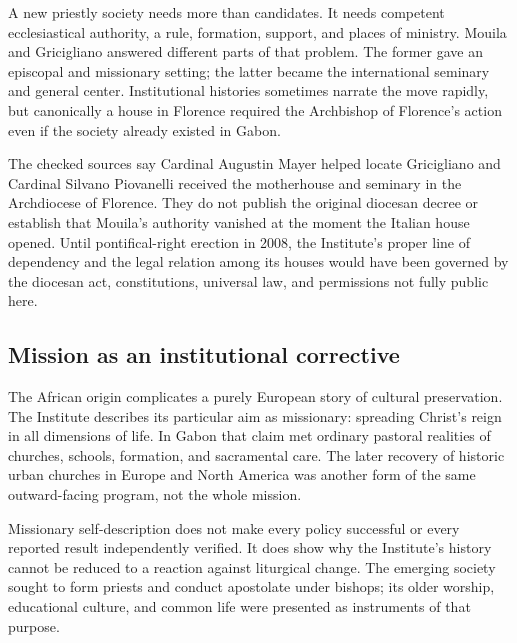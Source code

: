 A new priestly society needs more than candidates. It needs competent ecclesiastical authority, a rule, formation, support, and places of ministry. Mouila and Gricigliano answered different parts of that problem. The former gave an episcopal and missionary setting; the latter became the international seminary and general center. Institutional histories sometimes narrate the move rapidly, but canonically a house in Florence required the Archbishop of Florence's action even if the society already existed in Gabon.

The checked sources say Cardinal Augustin Mayer helped locate Gricigliano and Cardinal Silvano Piovanelli received the motherhouse and seminary in the Archdiocese of Florence. They do not publish the original diocesan decree or establish that Mouila's authority vanished at the moment the Italian house opened. Until pontifical-right erection in 2008, the Institute's proper line of dependency and the legal relation among its houses would have been governed by the diocesan act, constitutions, universal law, and permissions not fully public here.

\subsection{Mission as an institutional corrective}

The African origin complicates a purely European story of cultural preservation. The Institute describes its particular aim as missionary: spreading Christ's reign in all dimensions of life. In Gabon that claim met ordinary pastoral realities of churches, schools, formation, and sacramental care. The later recovery of historic urban churches in Europe and North America was another form of the same outward-facing program, not the whole mission.

Missionary self-description does not make every policy successful or every reported result independently verified. It does show why the Institute's history cannot be reduced to a reaction against liturgical change. The emerging society sought to form priests and conduct apostolate under bishops; its older worship, educational culture, and common life were presented as instruments of that purpose.

